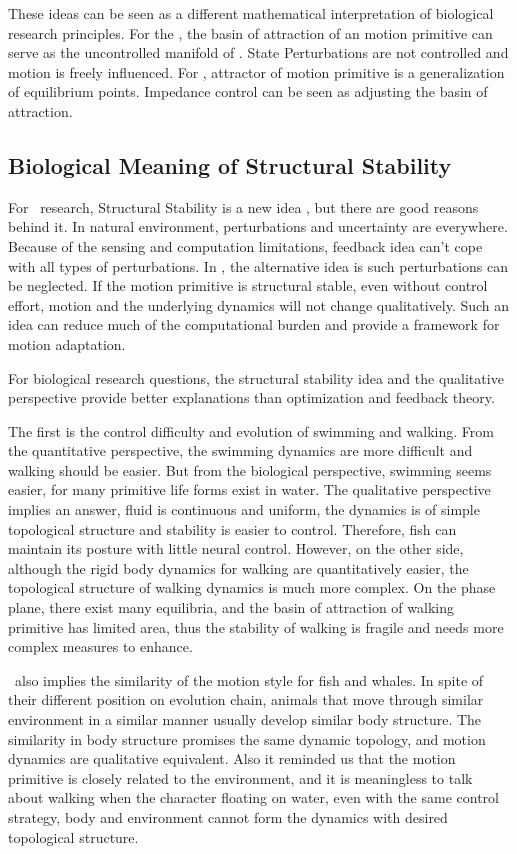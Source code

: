 These ideas can be seen as a different mathematical interpretation of biological research principles.
For the  \umh,  the basin of attraction of an motion primitive can serve as the uncontrolled manifold of \umh.
State Perturbations are not controlled and motion is freely influenced.
For \eph, attractor of motion primitive is a generalization of equilibrium points.
Impedance control can be seen as adjusting the basin of attraction.





\subsection{Biological Meaning of Structural Stability}
For \cms\ research, Structural Stability is a new idea , but there are good reasons behind it. 
In natural environment, perturbations and uncertainty are everywhere. 
Because of the sensing and computation limitations,  feedback idea  can't cope with all types of perturbations.
In \moit, the alternative idea is such perturbations can be neglected.
If the motion primitive is structural stable, even without control effort, motion and the underlying dynamics will not change qualitatively.
Such an idea can reduce much of the computational burden and provide a framework for motion adaptation.


For biological research questions, the structural stability idea and the qualitative perspective provide better explanations than optimization and feedback theory.

The first is the control difficulty and  evolution of swimming and walking.
From the quantitative perspective, the swimming dynamics are more difficult and walking should be easier.
But from the biological perspective, swimming seems easier, for many primitive life forms exist in water.
The qualitative perspective implies an answer, fluid is continuous and uniform, the dynamics is of simple topological structure and stability is easier to control.
Therefore, fish can maintain its posture with little neural control.
However, on the other side, although the rigid body dynamics for walking are quantitatively easier, the topological structure of walking dynamics is much more complex. 
On the phase plane, there exist many equilibria, and the basin of attraction of walking primitive has limited area,
thus the  stability of walking is fragile and needs more complex measures to enhance.

\moit\ also implies the similarity of the motion style for fish and whales.
In spite of their different position on evolution chain, animals that move through similar environment in a similar manner usually develop similar body structure.
The similarity in body structure promises the same dynamic topology, and motion dynamics are qualitative equivalent.
Also it reminded us that the motion primitive is closely related to the environment, and it is meaningless to talk about walking when the character floating on water, even with the same control strategy, body and environment cannot form the dynamics with desired topological structure.



